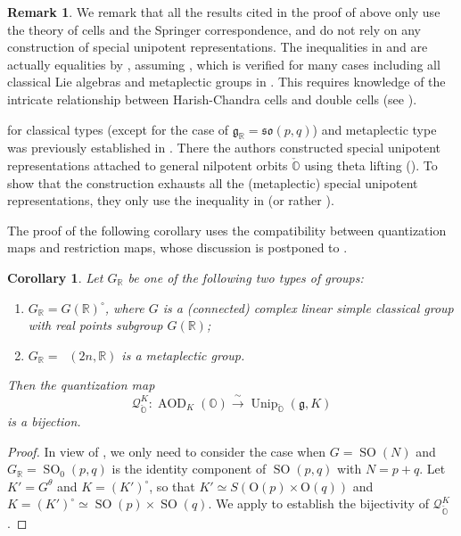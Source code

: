 \documentclass[11pt, a4paper]{amsart}
\newcommand{\g}{\mathfrak{g}}
\newcommand{\orb}{\mathbb{O}}
\newcommand{\ckorb}{\check{\orb}}
\newcommand{\fso}{\mathfrak{so}}
\DeclareMathOperator{\AOD}{AOD}
\DeclareMathOperator{\Unip}{Unip}
\DeclareMathOperator{\Mp}{\widetilde{Sp}}
\newcommand{\UnipOv}{\Unip_{\ckorb}}
\newcommand{\SO}{\operatorname{SO}}
\newcommand{\R}{\mathbb{R}}
\newcommand{\quan}{\mathcal{Q}}
\newcommand{\GR}{G_\R}
\newtheorem{Cor}[Thm]{Corollary}
\theoremstyle{definition}
\newtheorem{Rem}[Thm]{Remark}
\numberwithin{equation}{section}
\begin{document}
\begin{Rem} \label{rmk:counting}
	We remark that all the results cited in the proof of  above only use the theory of cells and the Springer correspondence, and do not rely on any construction of special unipotent representations.
	The inequalities in  and \cite[Proposition 3.6]{BMSZ:construction_unitarity} are actually equalities by \cite[Theorem 2.28]{BMSZ:counting}, assuming \cite[Conjecture 4.14]{BMSZ:counting}, which is verified for many cases including all classical Lie algebras and metaplectic groups in \cite[Corollary 4.24]{BMSZ:counting}. This requires knowledge of the intricate relationship between Harish-Chandra cells and double cells (see \cite[Section 4.5]{BMSZ:counting}). 

	 for classical types (except for the case of $\g_\R = \fso(p,q)$) and metaplectic type was previously established in \cite[Theorem 5.3, (b)]{BMSZ:construction_unitarity}. There the authors constructed special unipotent representations attached to general nilpotent orbits $\ckorb$ using theta lifting (\cite[Theorem 5.1]{BMSZ:construction_unitarity}). To show that the construction exhausts all the (metaplectic) special unipotent representations, they only use the inequality in  (or rather \cite[Proposition 3.6]{BMSZ:construction_unitarity}). 
\end{Rem}

The proof of the following corollary uses the compatibility between quantization maps and restriction maps, whose discussion is postponed to .

\begin{Cor} \label{cor:counting_classical_identity_component}
	Let $\GR$ be one of the following two types of groups:
	\begin{enumerate}
		\item $\GR = G(\R)^\circ$, where $G$ is a (connected) complex linear simple classical group with real points subgroup $G(\R)$;
		\item $\GR = \Mp(2n,\R)$ is a metaplectic group.
	\end{enumerate}	
	Then the quantization map 
	\[\quan_{\ckorb}^{K}: \AOD_{K}(\orb) \xrightarrow{\ \sim \ } \UnipOv(\g, K)\]
	is a bijection.
\end{Cor}

\begin{proof}
	In view of , we only need to consider the case when $G=\SO(N)$ and $\GR = \SO_0(p,q)$ is the identity component of $\SO(p,q)$ with $N=p+q$. Let $K' = G^\theta$ and $K = (K')^\circ$, so that $K' \simeq S(\mathrm{O}(p) \times \mathrm{O}(q))$ and $K = (K')^\circ \simeq \SO(p) \times \SO(q)$. We apply  to establish the bijectivity of $\quan_{\ckorb}^{K}$.
\end{proof}
\end{document}
